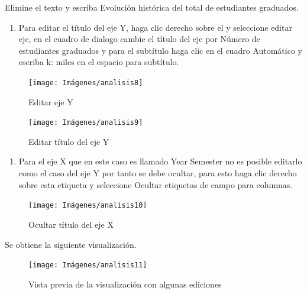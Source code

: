 \documentclass[
]{book}
\providecommand{\tightlist}{%
  \setlength{\itemsep}{0pt}\setlength{\parskip}{0pt}}
\begin{document}
Elimine el texto y escriba Evolución histórica del total de estudiantes graduados.

\begin{enumerate}
\def\labelenumi{\arabic{enumi}.}
\setcounter{enumi}{5}
\tightlist
\item
  Para editar el título del eje Y, haga clic derecho sobre el y seleccione editar eje, en el cuadro de dialogo cambie el título del eje por Número de estudiantes graduados y para el subtítulo haga clic en el cuadro Automático y escriba k: miles en el espacio para subtítulo.
\end{enumerate}

\begin{figure}

{\centering \texttt{[image: Imágenes/analisis8]} 

}

\caption{Editar eje Y}\label{fig:paso6-11lineas-fig}
\end{figure}

\begin{figure}

{\centering \texttt{[image: Imágenes/analisis9]} 

}

\caption{Editar título del eje Y}\label{fig:paso6-2lineas-fig}
\end{figure}

\begin{enumerate}
\def\labelenumi{\arabic{enumi}.}
\setcounter{enumi}{6}
\tightlist
\item
  Para el eje X que en este caso es llamado Year Semester no es posible editarlo como el caso del eje Y por tanto se debe ocultar, para esto haga clic derecho sobre esta etiqueta y seleccione Ocultar etiquetas de campo para columnas.
\end{enumerate}

\begin{figure}

{\centering \texttt{[image: Imágenes/analisis10]} 

}

\caption{Ocultar título del eje X}\label{fig:paso7lineas-fig}
\end{figure}

Se obtiene la siguiente visualización.

\begin{figure}

{\centering \texttt{[image: Imágenes/analisis11]} 

}

\caption{Vista previa de la visualización con algunas ediciones}\label{fig:paso7-1lineas-fig}
\end{figure}
\end{document}
